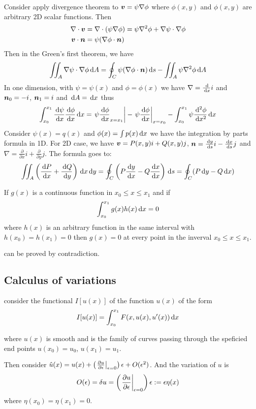 \documentclass{article}
\begin{document}
\begin{corollary}
    Consider apply divergence theorem to \(\boldsymbol{v} = \psi\nabla\phi\) where \(\phi(x,y)\) and \(\phi(x,y)\) are arbitrary 2D scalar functions. Then
    \begin{align*}
        \nabla \cdot\boldsymbol{v} &= \nabla\cdot(\psi\nabla\phi)=\psi\nabla^2\phi+\nabla\psi\cdot \nabla\phi\\
        \boldsymbol{v}\cdot\boldsymbol{n} &= \psi (\nabla\phi\cdot \boldsymbol{n})
    \end{align*}
    Then in the Green's first theorem, we have
    \[\iint_A\nabla\psi\cdot\nabla\phi\,\mathrm{d} A = \oint_C\psi (\nabla\phi\cdot\boldsymbol{n})\,\mathrm{d} s-\iint_A\psi\nabla^2\phi\,\mathrm{d} A\]
    In one dimension, with \(\psi=\psi(x)\) and \(\phi=\phi(x)\) we have \(\nabla=\frac{\,\mathrm{d}}{\,\mathrm{d} x}i\) and \(\boldsymbol{n}_0=-i\), \(\boldsymbol{n}_1=i\) and \(\,\mathrm{d} A = \,\mathrm{d} x\) thus
    \[\int_{x_0}^{x_1} \frac{\,\mathrm{d}\psi}{\,\mathrm{d} x}\frac{\,\mathrm{d}\phi}{\,\mathrm{d} x}\,\mathrm{d} x = \left.\psi\frac{\,\mathrm{d}\phi}{\,\mathrm{d} x}_{x=x_1}\right|-\left.\psi\frac{\,\mathrm{d}\phi}{\,\mathrm{d} x}\right|_{x=x_0} -\int_{x_0}^{x_1} \psi\frac{\,\mathrm{d}^2\phi}{\,\mathrm{d} x^2}\,\mathrm{d} x\]
    Consider \(\psi(x)=q(x)\) and \(\phi(x)=\int p(x)\,\mathrm{d} x\) we have the integration by parts formula in 1D. For 2D case, we have \(\boldsymbol{v}=P(x,y)i+Q(x,y)j\), \(\boldsymbol{n}=\frac{\,\mathrm{d} y}{\,\mathrm{d} s}i-\frac{\,\mathrm{d} x}{\,\mathrm{d} s}j\) and \(\nabla=\frac{\partial}{\partial x}i+\frac{\partial }{\partial y}j\). The formula goes to:
    \[\iint_A \left( \frac{\,\mathrm{d} P}{\,\mathrm{d} x}+\frac{\,\mathrm{d} Q}{\,\mathrm{d} y} \right)\,\mathrm{d} x\,\mathrm{d} y=\oint_C\left( P\frac{\,\mathrm{d} y}{\,\mathrm{d} x}-Q\frac{\,\mathrm{d} x}{\,\mathrm{d} x} \right)\,\mathrm{d} s=\oint_C (P\,\mathrm{d} y-Q\,\mathrm{d} x)\]
\end{corollary}

\begin{lemma}
    If \(g(x)\) is a continuous function in \(x_0\leq x\leq x_1\) and if 
    \[\int_{x_0}^{x_1} g(x)h(x)\,\mathrm{d} x=0\]
    where \(h(x)\) is an arbitrary function in the same interval with \(h(x_0)=h(x_1)=0\) then \(g(x)=0\) at every point in the inverval \(x_0\leq x\leq x_1\).
\end{lemma}

can be proved by contradiction.

\subsection{Calculus of variations}

\begin{definition}
    consider the functional \(I[u(x)]\) of the function \(u(x)\) of the form 
    \[I[u(x)] = \int_{x_0}^{x_1} F(x,u(x),u'(x))\,\mathrm{d} x\]

    where \(u(x)\) is smooth and is the family of curves passing through the speficied end points \(u(x_0)=u_0\), \(u(x_1)=u_1\). 
    
    Then consider \(\hat u(x) = u(x) +\left( \left.\frac{\partial u}{\partial \epsilon}\right|_{\epsilon=0} \right)\epsilon+O(\epsilon^2)\). And the variation of \(u\) is
    \[O(\epsilon) = \delta u = \left( \left.\frac{\partial u}{\partial \epsilon}\right|_{\epsilon=0} \right)\epsilon:= \epsilon \eta(x)\]
    where \(\eta(x_0) = \eta(x_1)=0\).
\end{definition}
\end{document}
